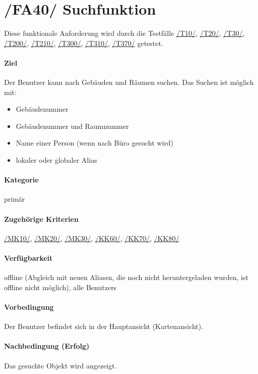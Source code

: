 \section[Suchfunktion]{/FA40/ Suchfunktion}
\label{/FA40/}
Diese funktionale Anforderung wird durch die Testfälle \hyperref[/T10/]{/T10/}, \hyperref[/T20/]{/T20/}, \hyperref[/T30/]{/T30/}, \hyperref[/T200/]{/T200/}, \hyperref[/T210/]{/T210/}, \hyperref[/T300/]{/T300/}, \hyperref[/T310/]{/T310/}, \hyperref[/T370/]{/T370/} getestet.
\paragraph{Ziel}
Der \Gls{Benutzer} kann nach Gebäuden und Räumen suchen. 
Das Suchen ist möglich mit:
\begin{itemize}
    \item Gebäudenummer
    \item Gebäudenummer und Raumnummer
    \item Name einer Person (wenn nach Büro gesucht wird)
    \item \gls{lokal}er oder \gls{global}er \Gls{Alias}
\end{itemize}

\paragraph{Kategorie}
primär
\paragraph{Zugehörige Kriterien}
\hyperref[/MK10/]{/MK10/}, \hyperref[/MK20/]{/MK20/}, \hyperref[/MK30/]{/MK30/}, \hyperref[/KK60/]{/KK60/}, \hyperref[/KK70/]{/KK70/}, \hyperref[/KK80/]{/KK80/} 
\paragraph{Verfügbarkeit}
\gls{offline} (Abgleich mit neuen \Glspl{Alias}n, die noch nicht heruntergeladen wurden, ist \gls{offline} nicht möglich), alle \Glspl{Benutzer}
\paragraph{Vorbedingung}
Der \Gls{Benutzer} befindet sich in der Hauptansicht (\Gls{Kartenansicht}).
\paragraph{Nachbedingung (Erfolg)}
Das gesuchte Objekt wird angezeigt.
